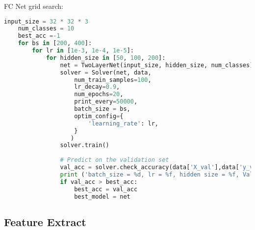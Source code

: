 \documentclass[a4paper]{article}
\begin{document}
FC Net grid search:
\begin{lstlisting}[language=Python, caption=FC Net grid search]
    input_size = 32 * 32 * 3
    num_classes = 10
    best_acc =-1
    for bs in [200, 400]:
        for lr in [1e-3, 1e-4, 1e-5]:
            for hidden_size in [50, 100, 200]:
                net = TwoLayerNet(input_size, hidden_size, num_classes)
                solver = Solver(net, data,
                    num_train_samples=100,
                    lr_decay=0.9,
                    num_epochs=20,
                    print_every=50000,
                    batch_size = bs,
                    optim_config={
                        'learning_rate': lr,
                    }
                   )
                solver.train()
    
                # Predict on the validation set
                val_acc = solver.check_accuracy(data['X_val'],data['y_val'])
                print ('batch_size = %d, lr = %f, hidden size = %f, Valid_accuracy: %f' %(bs, lr, hidden_size,val_acc))
                if val_acc > best_acc:
                    best_acc = val_acc
                    best_model = net
\end{lstlisting}
\subsection{Feature Extract}
\begin{lstlisting}[language=Python, caption=FC Net grid search]

\end{lstlisting}
\end{document}
